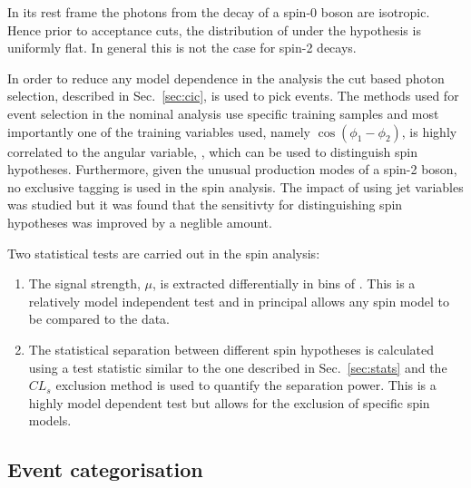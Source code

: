 In its rest frame the photons from the decay of a spin-0 boson are isotropic. Hence prior to acceptance cuts, the distribution of \costhetastar 
under the \zerop hypothesis is uniformly flat. In general this is not the case for spin-2 decays. 

In order to reduce any model dependence in the analysis the cut based photon selection, described in Sec.~\ref{sec:cic}, is used to pick events. The \MVA methods used for event selection in the nominal analysis use specific \SM \MC training samples and most importantly one of the training variables used, namely $\cos(\phi_{1}-\phi_{2})$, is highly correlated to the angular variable, \costhetastar, which can be used to distinguish spin hypotheses. Furthermore, given the unusual production modes of a spin-2 boson, no exclusive tagging is used in the spin analysis. The impact of using jet variables was studied but it was found that the sensitivty for distinguishing spin hypotheses was improved by a neglible amount.

Two statistical tests are carried out in the spin analysis:

\begin{enumerate}
  \item The signal strength, $\mu$, is extracted differentially in bins of \abscostheta. This is a relatively model independent test and in principal allows any spin model to be compared to the data.
  \item The statistical separation between different spin hypotheses is calculated using a test statistic similar to the one described in Sec.~\ref{sec:stats} and the $CL_{s}$ exclusion method is used to quantify the separation power. This is a highly model dependent test but allows for the exclusion of specific spin models.
\end{enumerate}

\subsection{Event categorisation}
\label{sec:spin_cats}

